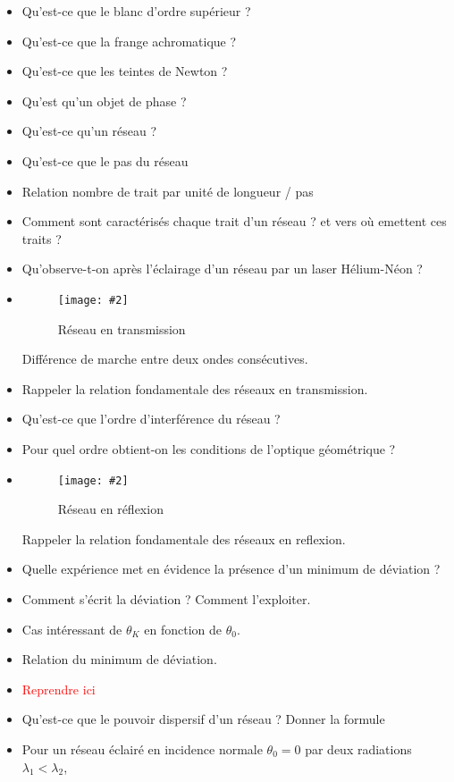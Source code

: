 \documentclass[a4paper, 11pt, hidelinks]{article}
\newcommand{\img}[4]{\begin{figure}[!ht]
    \centering
    \texttt{[image: \#2]}
    \caption{#3}
    \label{#4}
    \end{figure} }
\begin{document}
\begin{itemize}
    \item Qu'est-ce que le blanc d'ordre supérieur ? \cite{Chapitre8}
    \item Qu'est-ce que la frange achromatique ? \cite{Chapitre8}
    \item Qu'est-ce que les teintes de Newton ? \cite{Chapitre8}
    \item Qu'est qu'un objet de phase ? \cite{Chapitre8}
    \item Qu'est-ce qu'un réseau ? \cite{Chapitre6}
    \item Qu'est-ce que le pas du réseau \cite{Chapitre6}
    \item Relation nombre de trait par unité de longueur / pas \cite{Chapitre6}
    \item Comment sont caractérisés chaque trait d'un réseau ? et vers où emettent ces traits ? \cite{Chapitre6}
    \item Qu'observe-t-on après l'éclairage d'un réseau par un laser Hélium-Néon ? \cite{Chapitre6}
    \item \img{0.5}{Images/Reseau en transmission.PNG}{Réseau en transmission}{Figure 1}
    Différence de marche entre deux ondes consécutives. \cite{Chapitre6}
    \item Rappeler la relation fondamentale des réseaux en transmission. \cite{Chapitre6}
    \item Qu'est-ce que l'ordre d'interférence du réseau ? \cite{Chapitre6}
    \item Pour quel ordre obtient-on les conditions de l'optique géométrique ? \cite{Chapitre6}
    \newpage
    \item \img{0.5}{Images/Reseau en reflexion.PNG}{Réseau en réflexion}{Figure 2}
    Rappeler la relation fondamentale des réseaux en reflexion. \cite{Chapitre6}
    \item Quelle expérience met en évidence la présence d'un minimum de déviation ? \cite{Chapitre6}
    \item Comment s'écrit la déviation ? Comment l'exploiter. \cite{Chapitre6}
    \item Cas intéressant de $\theta_K$ en fonction de $\theta_0$. \cite{Chapitre6}
    \item Relation du minimum de déviation. \cite{Chapitre6}
    \item \textcolor{red}{Reprendre ici}
    \item Qu'est-ce que le pouvoir dispersif d'un réseau ? Donner la formule \cite{Chapitre6}
    \item Pour un réseau éclairé en incidence normale $\theta_0=0$ par deux radiations $\lambda_1<\lambda_2$,

\end{itemize}
\end{document}
